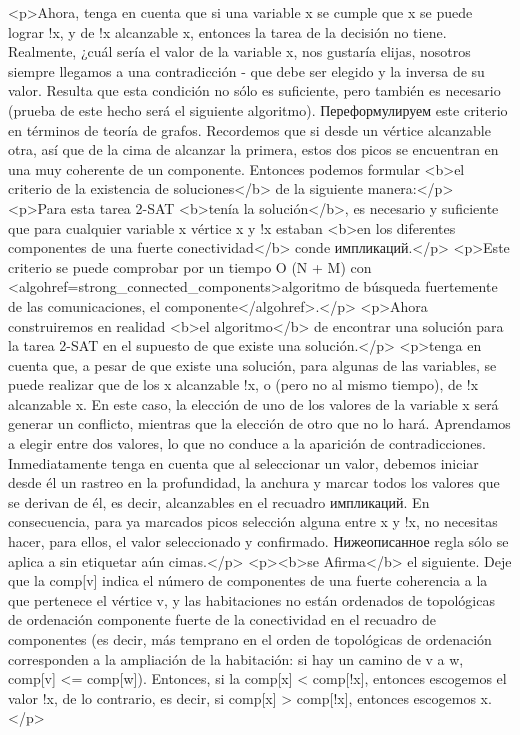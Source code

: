 <p>Ahora, tenga en cuenta que si una variable x se cumple que x se puede lograr !x, y de !x alcanzable x, entonces la tarea de la decisión no tiene. Realmente, ¿cuál sería el valor de la variable x, nos gustaría elijas, nosotros siempre llegamos a una contradicción - que debe ser elegido y la inversa de su valor. Resulta que esta condición no sólo es suficiente, pero también es necesario (prueba de este hecho será el siguiente algoritmo). Переформулируем este criterio en términos de teoría de grafos. Recordemos que si desde un vértice alcanzable otra, así que de la cima de alcanzar la primera, estos dos picos se encuentran en una muy coherente de un componente. Entonces podemos formular <b>el criterio de la existencia de soluciones</b> de la siguiente manera:</p>
<p>Para esta tarea 2-SAT <b>tenía la solución</b>, es necesario y suficiente que para cualquier variable x vértice x y !x estaban <b>en los diferentes componentes de una fuerte conectividad</b> conde импликаций.</p>
<p>Este criterio se puede comprobar por un tiempo O (N + M) con <algohref=strong_connected_components>algoritmo de búsqueda fuertemente de las comunicaciones, el componente</algohref>.</p>
<p>Ahora construiremos en realidad <b>el algoritmo</b> de encontrar una solución para la tarea 2-SAT en el supuesto de que existe una solución.</p>
<p>tenga en cuenta que, a pesar de que existe una solución, para algunas de las variables, se puede realizar que de los x alcanzable !x, o (pero no al mismo tiempo), de !x alcanzable x. En este caso, la elección de uno de los valores de la variable x será generar un conflicto, mientras que la elección de otro que no lo hará. Aprendamos a elegir entre dos valores, lo que no conduce a la aparición de contradicciones. Inmediatamente tenga en cuenta que al seleccionar un valor, debemos iniciar desde él un rastreo en la profundidad, la anchura y marcar todos los valores que se derivan de él, es decir, alcanzables en el recuadro импликаций. En consecuencia, para ya marcados picos selección alguna entre x y !x, no necesitas hacer, para ellos, el valor seleccionado y confirmado. Нижеописанное regla sólo se aplica a sin etiquetar aún cimas.</p>
<p><b>se Afirma</b> el siguiente. Deje que la comp[v] indica el número de componentes de una fuerte coherencia a la que pertenece el vértice v, y las habitaciones no están ordenados de topológicas de ordenación componente fuerte de la conectividad en el recuadro de componentes (es decir, más temprano en el orden de topológicas de ordenación corresponden a la ampliación de la habitación: si hay un camino de v a w, comp[v] <= comp[w]). Entonces, si la comp[x] < comp[!x], entonces escogemos el valor !x, de lo contrario, es decir, si comp[x] > comp[!x], entonces escogemos x.</p>
